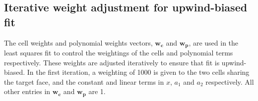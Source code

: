 \documentclass{article}
\begin{document}
\subsection{Iterative weight adjustment for upwind-biased fit}
The cell weights and polynomial weights vectors, $\mathbf{w_c}$ and $\mathbf{w_p}$, are used in the least squares fit to control the weightings of the cells and polynomial terms respectively.  These weights are adjusted iteratively to ensure that fit is upwind-biased.
In the first iteration, a weighting of 1000 is given to the two cells sharing the target face, and the constant and linear terms in $x$, $a_1$ and $a_2$ respectively.  All other entries in $\mathbf{w_c}$ and $\mathbf{w_p}$ are 1.




\end{document}
